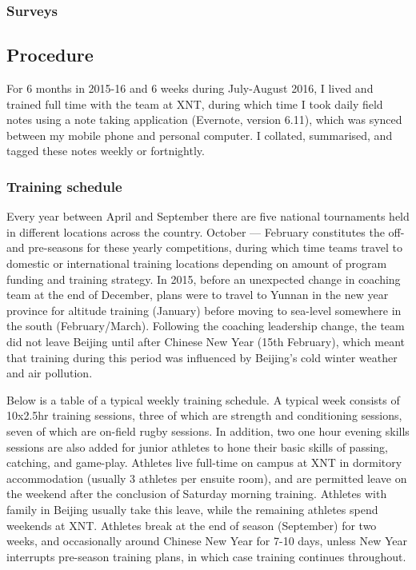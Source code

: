 {  \subsubsection{Surveys}



  \subsection{Procedure}

  For 6 months in 2015-16 and 6 weeks during July-August 2016, I lived and trained full time with the team at XNT, during which time I took daily field notes using a note taking application (Evernote, version 6.11), which was synced between my mobile phone and personal computer. I collated, summarised, and tagged these notes weekly or fortnightly.


  \subsubsection{Training schedule}
    Every year between April and September there are five national tournaments held in different locations across the country.  October –-- February constitutes the off- and pre-seasons for these yearly competitions, during which time teams travel to domestic or international training locations depending on amount of program funding and training strategy.  In 2015, before an unexpected change in coaching team at the end of December, plans were to travel to Yunnan in the new year province for altitude training (January) before moving to sea-level somewhere in the south (February/March).  Following the coaching leadership change, the team did not leave Beijing until after Chinese New Year (15th February), which meant that training during this period was influenced by Beijing's cold winter weather and air pollution.

    Below is a table of a typical weekly training schedule. A typical week consists of 10x2.5hr training sessions, three of which are strength and conditioning sessions, seven of which are on-field rugby sessions.  In addition, two one hour evening skills sessions are also added for junior athletes to hone their basic skills of passing, catching, and game-play.  Athletes live full-time on campus at XNT in dormitory accommodation (usually 3 athletes per ensuite room), and are permitted leave on the weekend after the conclusion of Saturday morning training.  Athletes with family in Beijing usually take this leave, while the remaining athletes spend weekends at XNT.  Athletes break at the end of season (September) for two weeks, and occasionally around Chinese New Year for 7-10 days, unless New Year interrupts pre-season training plans, in which case training continues throughout.

}
